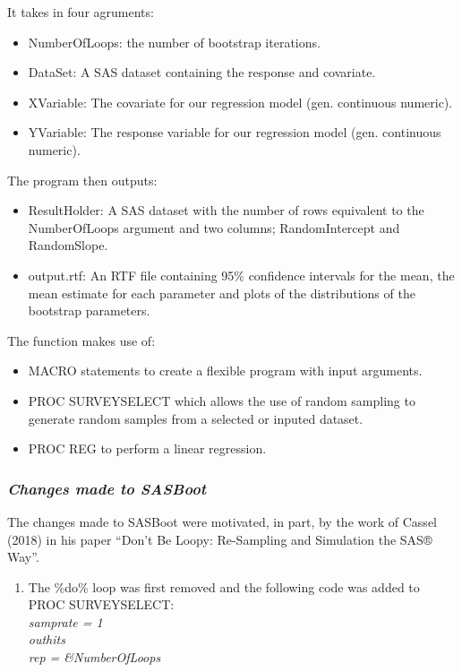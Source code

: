 \documentclass[]{article}
\providecommand{\tightlist}{%
  \setlength{\itemsep}{0pt}\setlength{\parskip}{0pt}}
\begin{document}
It takes in four agruments:

\begin{itemize}
\tightlist
\item
  NumberOfLoops: the number of bootstrap iterations.
\item
  DataSet: A SAS dataset containing the response and covariate.
\item
  XVariable: The covariate for our regression model (gen. continuous
  numeric).
\item
  YVariable: The response variable for our regression model (gen.
  continuous numeric).
\end{itemize}

The program then outputs:

\begin{itemize}
\tightlist
\item
  ResultHolder: A SAS dataset with the number of rows equivalent to the
  NumberOfLoops argument and two columns; RandomIntercept and
  RandomSlope.
\item
  output.rtf: An RTF file containing 95\% confidence intervals for the
  mean, the mean estimate for each parameter and plots of the
  distributions of the bootstrap parameters.
\end{itemize}

The function makes use of:

\begin{itemize}
\tightlist
\item
  MACRO statements to create a flexible program with input arguments.
\item
  PROC SURVEYSELECT which allows the use of random sampling to generate
  random samples from a selected or inputed dataset.
\item
  PROC REG to perform a linear regression.
\end{itemize}

\subsubsection{\texorpdfstring{\emph{Changes made to
SASBoot}}{Changes made to SASBoot}}\label{changes-made-to-sasboot}

The changes made to SASBoot were motivated, in part, by the work of
Cassel (2018) in his paper ``Don't Be Loopy: Re-Sampling and Simulation
the SAS® Way''.

\begin{enumerate}
\def\labelenumi{\arabic{enumi}.}
\tightlist
\item
  The \%do\% loop was first removed and the following code was added to
  PROC SURVEYSELECT:\\
  \emph{samprate = 1}\\
  \emph{outhits}\\
  \emph{rep = \&NumberOfLoops}
\end{enumerate}
\end{document}
